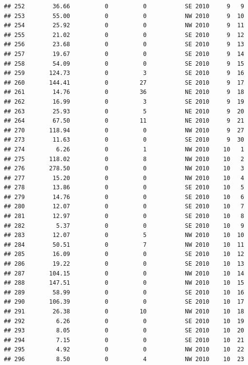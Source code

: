 \documentclass[
]{article}
\begin{document}
\begin{verbatim}
## 252        36.66          0          0           SE 2010     9   9
## 253        55.00          0          0           NW 2010     9  10
## 254        25.92          0          0           NW 2010     9  11
## 255        21.02          0          0           SE 2010     9  12
## 256        23.68          0          0           SE 2010     9  13
## 257        19.67          0          0           SE 2010     9  14
## 258        54.09          0          0           SE 2010     9  15
## 259       124.73          0          3           SE 2010     9  16
## 260       144.41          0         27           SE 2010     9  17
## 261        14.76          0         36           NE 2010     9  18
## 262        16.99          0          3           SE 2010     9  19
## 263        25.93          0          5           NE 2010     9  20
## 264        67.50          0         11           NE 2010     9  21
## 270       118.94          0          0           NW 2010     9  27
## 273        11.63          0          0           SE 2010     9  30
## 274         6.26          0          1           NW 2010    10   1
## 275       118.02          0          8           NW 2010    10   2
## 276       278.50          0          0           NW 2010    10   3
## 277        15.20          0          0           NW 2010    10   4
## 278        13.86          0          0           SE 2010    10   5
## 279        14.76          0          0           SE 2010    10   6
## 280        12.07          0          0           SE 2010    10   7
## 281        12.97          0          0           SE 2010    10   8
## 282         5.37          0          0           SE 2010    10   9
## 283        12.07          0          5           NW 2010    10  10
## 284        50.51          0          7           NW 2010    10  11
## 285        16.09          0          0           SE 2010    10  12
## 286        19.22          0          0           SE 2010    10  13
## 287       104.15          0          0           NW 2010    10  14
## 288       147.51          0          0           NW 2010    10  15
## 289        58.99          0          0           SE 2010    10  16
## 290       106.39          0          0           SE 2010    10  17
## 291        26.38          0         10           NW 2010    10  18
## 292         6.26          0          0           SE 2010    10  19
## 293         8.05          0          0           SE 2010    10  20
## 294         7.15          0          0           SE 2010    10  21
## 295         4.92          0          0           NW 2010    10  22
## 296         8.50          0          4           NW 2010    10  23

\end{verbatim}
\end{document}
